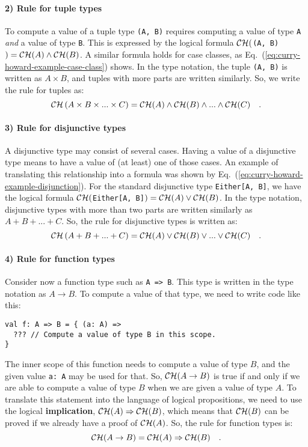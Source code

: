 \paragraph{2) Rule for tuple types}

To compute a value of a tuple type \lstinline!(A, B)! requires computing
a value of type \lstinline!A! \emph{and} a value of type \lstinline!B!.
This is expressed by the logical formula ${\cal CH}($\lstinline!(A, B)!$)={\cal CH}(A)\wedge{\cal CH}(B)$.
A similar formula holds for case classes, as Eq.~(\ref{eq:curry-howard-example-case-class})
shows. In the type notation, the tuple \lstinline!(A, B)! is written
as $A\times B$, and tuples with more parts are written similarly.
So, we write the rule for tuples as:
\[
{\cal CH}\left(A\times B\times...\times C\right)={\cal CH}(A)\wedge{\cal CH}(B)\wedge...\wedge{\cal CH}(C)\quad.
\]


\paragraph{3) Rule for disjunctive types}

A disjunctive type may consist of several cases. Having a value of
a disjunctive type means to have a value of (at least) one of those
cases. An example of translating this relationship into a formula
was shown by Eq.~(\ref{eq:curry-howard-example-disjunction}). For
the standard disjunctive type \lstinline!Either[A, B]!, we have the
logical formula ${\cal CH}($\lstinline!Either[A, B]!$)={\cal CH}(A)\vee{\cal CH}(B)$.
In the type notation, disjunctive types with more than two parts are
written similarly as $A+B+...+C$. So, the rule for disjunctive types
is written as:
\[
{\cal CH}\left(A+B+...+C\right)={\cal CH}(A)\vee{\cal CH}(B)\vee...\vee{\cal CH}(C)\quad.
\]


\paragraph{4) Rule for function types}

Consider now a function type such as \lstinline!A => B!. This type
is written in the type notation as $A\rightarrow B$. To compute a
value of that type, we need to write code like this:
\begin{lstlisting}
val f: A => B = { (a: A) =>
  ??? // Compute a value of type B in this scope.
}
\end{lstlisting}
The inner scope of this function needs to compute a value of type
$B$, and the given value \lstinline!a: A! may be used for that.
So, ${\cal CH}(A\rightarrow B)$ is true if and only if we are able
to compute a value of type $B$ when we are given a value of type
$A$. To translate this statement into the language of logical propositions,
we need to use the logical \textbf{implication},
${\cal CH}(A)\Rightarrow{\cal CH}(B)$, which means that ${\cal CH}(B)$
can be proved if we already have a proof of ${\cal CH}(A)$. So, the
rule for function types is:
\[
{\cal CH}(A\rightarrow B)={\cal CH}(A)\Rightarrow{\cal CH}(B)\quad.
\]



